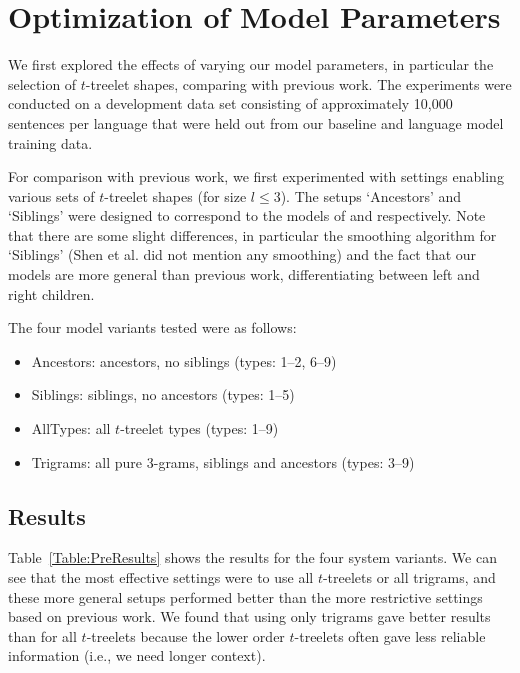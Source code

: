 \documentclass[english]{jnlp_1.4}
\begin{document}
\section{Optimization of Model Parameters}
\label{Section:Tuning}

We first explored the effects of varying our model parameters, in particular
the selection of $t$-treelet shapes, comparing with previous work.
The experiments were conducted on a development data set consisting of approximately 10,000 sentences
per language that were held out from our baseline and language model training data.

For comparison with previous work, we first experimented with
settings enabling various sets of $t$-treelet shapes (for size $l \le 3$). The setups
`Ancestors' and `Siblings' were designed to correspond to the models of
\cite{Gubbins13} and \cite{Shen08} respectively. Note that there are some
slight differences, in particular the smoothing algorithm for `Siblings' (Shen et al.
did not mention any smoothing) and the fact that our models are more
general than previous work, differentiating between left and right children.

The four model variants tested were as follows:
\begin{itemize}
    \item Ancestors: ancestors, no siblings (types: 1--2, 6--9)
    \item Siblings: siblings, no ancestors (types: 1--5)
    \item AllTypes: all $t$-treelet types (types: 1--9)
    \item Trigrams: all pure 3-grams, siblings and ancestors (types: 3--9)
\end{itemize}


\subsection{Results}

Table~\ref{Table:PreResults} shows the results for the four system variants.
We can see that the most effective settings were to use all $t$-treelets
or all trigrams, and these more general setups performed better than
the more restrictive settings based on previous work. We found that
using only trigrams gave better results than for all $t$-treelets because
the lower order $t$-treelets often gave less reliable information (i.e., we
need longer context).

\begin{table}[t]
\label{Table:PreResults}

\end{table}
\end{document}

